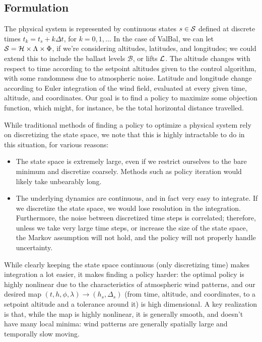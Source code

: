 \documentclass[11pt]{scrartcl} %
\begin{document}
\subsection{Formulation}
The physical system is represented by continuous states $s\in\mathcal{S}$ defined at discrete times $t_k=t_s + k \Delta t$, for $k=0,1,\dots$ In the case of ValBal, we can let $\mathcal{S}=\mathcal{H}\times\Lambda\times\Phi$, if we're considering altitudes, latitudes, and longitudes; we could extend this to include the ballast levels $\mathcal{B}$, or lifts $\mathcal{L}$.
The altitude changes with respect to time according to the setpoint altitudes given to the control algorithm, with some randomness due to atmospheric noise. Latitude and longitude change according to Euler integration of the wind field, evaluated at every given time, altitude, and coordinates. Our goal is to find a policy to maximize some objection function, which might, for instance, be the total horizontal distance travelled.

While traditional methods of finding a policy to optimize a physical system rely on discretizing the state space, we note that this is highly intractable to do in this situation, for various reasons:
\begin{itemize}
\item The state space is extremely large, even if we restrict ourselves to the bare minimum and discretize coarsely. Methods such as policy iteration would likely take unbearably long.
\item The underlying dynamics are continuous, and in fact very easy to integrate. If we discretize the state space, we would lose resolution in the integration. Furthermore, the noise between discretized time steps is correlated; therefore, unless we take very large time steps, or increase the size of the state space, the Markov assumption will not hold, and the policy will not properly handle uncertainty.
\end{itemize}
While clearly keeping the state space continuous (only discretizing time) makes integration a lot easier, it makes finding a policy harder: the optimal policy is highly nonlinear due to the characteristics of atmospheric wind patterns, and our desired map $(t,h,\phi,\lambda)\to (h_s, \Delta_s)$ (from time, altitude, and coordinates, to a setpoint altitude and a tolerance around it) is high dimensional. A key realization is that, while the map is highly nonlinear, it is generally smooth, and doesn't have many local minima: wind patterns are generally spatially large and temporally slow moving.
\end{document}
